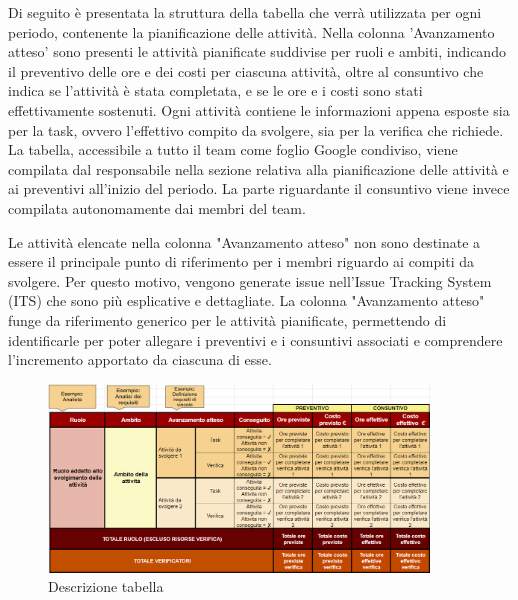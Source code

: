 Di seguito è presentata la struttura della tabella che verrà utilizzata per ogni periodo, contenente la pianificazione delle attività. Nella colonna 'Avanzamento atteso' sono presenti le attività pianificate suddivise per ruoli e ambiti, indicando il preventivo delle ore e dei costi per ciascuna attività, oltre al consuntivo che indica se l'attività è stata completata, e se le ore e i costi sono stati effettivamente sostenuti.
Ogni attività contiene le informazioni appena esposte sia per la task, ovvero l'effettivo compito da svolgere,  sia per la verifica che richiede.
La tabella, accessibile a tutto il team come foglio Google condiviso, viene compilata dal responsabile nella sezione relativa alla pianificazione delle attività e ai preventivi all'inizio del periodo. La parte riguardante il consuntivo viene invece compilata autonomamente dai membri del team.

\vspace{0.5cm}Le attività elencate nella colonna "Avanzamento atteso" non sono destinate a essere il principale punto di riferimento per i membri riguardo ai compiti da svolgere. Per questo motivo, vengono generate issue nell'Issue Tracking System (ITS) che sono più esplicative e dettagliate. La colonna "Avanzamento atteso" funge da riferimento generico per le attività pianificate, permettendo di identificarle per poter allegare i preventivi e i consuntivi associati e comprendere l'incremento apportato da ciascuna di esse.
\begin{figure}[H]
    \centering
    \includegraphics[width=0.9\textwidth]{../Images/spiegazioneTabella.png}
    \caption{Descrizione tabella}
    \label{fig:spiegazioneTabella}
\end{figure}